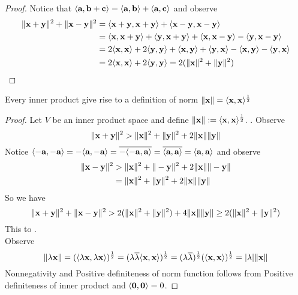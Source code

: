 \documentclass{report}
\begin{document}
\begin{proof}
Notice that $\langle \textbf{a},\textbf{b}+\textbf{c} \rangle=\langle \textbf{a},\textbf{b} \rangle+\langle \textbf{a},\textbf{c} \rangle$ and observe 
\begin{align}
\| \textbf{x}+\textbf{y} \|^2+\| \textbf{x}-\textbf{y} \|^2&=\langle \textbf{x}+\textbf{y},\textbf{x}+\textbf{y} \rangle+\langle \textbf{x}-\textbf{y},\textbf{x}-\textbf{y} \rangle\\
&=\langle \textbf{x},\textbf{x}+\textbf{y} \rangle+\langle \textbf{y},\textbf{x}+\textbf{y} \rangle+\langle \textbf{x},\textbf{x}-\textbf{y} \rangle-\langle \textbf{y},\textbf{x}-\textbf{y} \rangle\\
&=2\langle \textbf{x},\textbf{x} \rangle+2\langle \textbf{y},\textbf{y} \rangle+\langle \textbf{x},\textbf{y} \rangle+\langle \textbf{y},\textbf{x} \rangle-\langle \textbf{x},\textbf{y} \rangle-\langle \textbf{y},\textbf{x} \rangle\\
&=2\langle \textbf{x},\textbf{x} \rangle+2\langle \textbf{y},\textbf{y} \rangle=2(\| \textbf{x} \|^2+\| \textbf{y} \|^2)
\end{align}
\end{proof}
\begin{theorem}
\label{1.6.10}
Every inner product give rise to a definition of norm $\| \textbf{x} \|=\langle \textbf{x},\textbf{x} \rangle^{\frac{1}{2}}$
\end{theorem}
\begin{proof}
Let $V$ be an inner product space and define  $\| \textbf{x} \|:=\langle \textbf{x},\textbf{x} \rangle^{\frac{1}{2}}$. . Observe
\begin{equation}
\| \textbf{x}+\textbf{y} \|^2>\| \textbf{x} \|^2+\| \textbf{y} \|^2+2\| \textbf{x} \|\| \textbf{y} \|
\end{equation}
Notice $\langle -\textbf{a},-\textbf{a} \rangle=-\langle \textbf{a},-\textbf{a} \rangle=\overline{-\langle -\textbf{a},\textbf{a} \rangle}=\overline{\langle \textbf{a},\textbf{a} \rangle}=\langle \textbf{a},\textbf{a} \rangle$ and observe
\begin{align}
  \| \textbf{x}-\textbf{y} \|^2&>\| \textbf{x} \|^2+\| -\textbf{y} \|^2+2\| \textbf{x} \|\| -\textbf{y} \|\\
  &= \| \textbf{x} \|^2+\| \textbf{y} \|^2+2\| \textbf{x} \|\| \textbf{y} \|
\end{align}
So we have
\begin{equation}
\| \textbf{x}+\textbf{y} \|^2+\| \textbf{x}-\textbf{y} \|^2>2(\| \textbf{x} \|^2+\| \textbf{y} \|^2)+4\| \textbf{x} \|\| \textbf{y} \|\geq 2(\| \textbf{x} \|^2+\| \textbf{y} \|^2)
\end{equation}
This \CaC to .\\

Observe
\begin{equation}
\| \lambda \textbf{x} \|=(\langle \lambda \textbf{x},\lambda \textbf{x} \rangle)^{\frac{1}{2}}=(\lambda \overline{\lambda }\langle \textbf{x},\textbf{x} \rangle)^{\frac{1}{2}}=(\lambda \overline{\lambda })^{\frac{1}{2}}(\langle \textbf{x},\textbf{x} \rangle)^{\frac{1}{2}}=|\lambda |\| \textbf{x} \|
\end{equation}
Nonnegativity and Positive definiteness of norm function follows from Positive definiteness of inner product and $\langle \textbf{0},\textbf{0} \rangle=0$. 
\end{proof}
\end{document}
